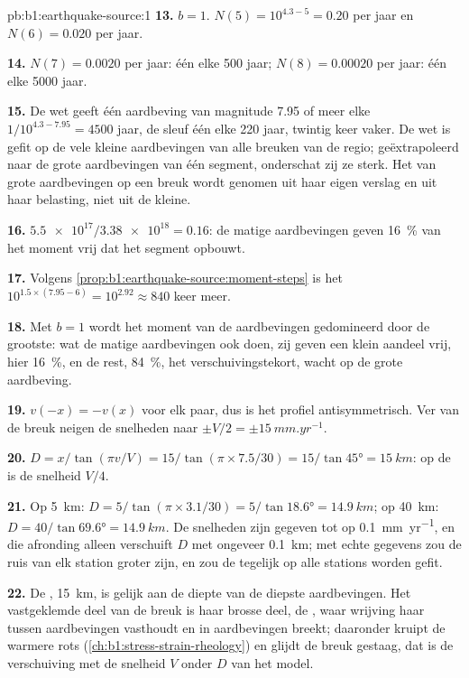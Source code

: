 \begin{solution}{pb:b1:earthquake-source:1}
\textbf{13.} $b = 1$. $N(5) = 10^{4.3 - 5} = 0.20$ per jaar en $N(6) = 0.020$ per
jaar.

\textbf{14.} $N(7) = 0.0020$ per jaar: één elke 500 jaar; $N(8) = 0.00020$ per
jaar: één elke \num{5000} jaar.

\textbf{15.} De wet geeft één aardbeving van magnitude 7.95 of meer elke
$1/10^{4.3 - 7.95} = \num{4500}$ jaar, de sleuf één elke 220 jaar, twintig keer vaker.
De wet is gefit op de vele kleine aardbevingen van alle breuken van de regio;
geëxtrapoleerd naar de grote aardbevingen van één segment, onderschat zij ze sterk. Het
 van grote aardbevingen op een breuk wordt genomen uit haar eigen verslag
en uit haar belasting, niet uit de kleine.

\textbf{16.} $\num{5.5e17}/\num{3.38e18} = 0.16$: de matige aardbevingen geven
\qty{16}{\percent} van het moment vrij dat het segment opbouwt.

\textbf{17.} Volgens \cref{prop:b1:earthquake-source:moment-steps} is het
$10^{1.5\times(7.95 - 6)} = 10^{2.92} \approx 840$ keer meer.

\textbf{18.} Met $b = 1$ wordt het moment van de aardbevingen gedomineerd door de
grootste: wat de matige aardbevingen ook doen, zij geven een klein aandeel vrij, hier
\qty{16}{\percent}, en de rest, \qty{84}{\percent}, het verschuivingstekort, wacht op de
grote aardbeving.

\textbf{19.} $v(-x) = -v(x)$ voor elk paar, dus is het profiel antisymmetrisch. Ver van de
breuk neigen de snelheden naar $\pm V/2 = \pm\qty{15}{mm.yr^{-1}}$.

\textbf{20.} $D = x/\tan(\pi v/V) = 15/\tan(\pi\times7.5/30) = 15/\tan\ang{45} =
\qty{15}{km}$: op de  is de snelheid $V/4$.

\textbf{21.} Op \qty{5}{km}: $D = 5/\tan(\pi\times3.1/30) = 5/\tan\ang{18.6} =
\qty{14.9}{km}$; op \qty{40}{km}: $D = 40/\tan\ang{69.6} = \qty{14.9}{km}$. De
snelheden zijn gegeven tot op \qty{0.1}{mm.yr^{-1}}, en die afronding alleen verschuift
$D$ met ongeveer \qty{0.1}{km}; met echte gegevens zou de ruis van elk station groter zijn,
en zou de  tegelijk op alle stations worden gefit.

\textbf{22.} De , \qty{15}{km}, is gelijk aan de diepte van de diepste
aardbevingen. Het vastgeklemde deel van de breuk is haar brosse deel, de ,
waar wrijving haar tussen aardbevingen vasthoudt en in aardbevingen breekt; daaronder
kruipt de warmere rots (\cref{ch:b1:stress-strain-rheology}) en glijdt de breuk gestaag,
dat is de verschuiving met de snelheid $V$ onder $D$ van het model.


\end{solution}
